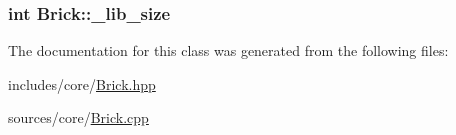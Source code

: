 \subsubsection[{\+\_\+lib\+\_\+size}]{\setlength{\rightskip}{0pt plus 5cm}int Brick\+::\+\_\+lib\+\_\+size\hspace{0.3cm}{\ttfamily [protected]}}\label{class_brick_a990cb3ac8d11d28aa1fa68a4583ed704}


The documentation for this class was generated from the following files\+:\begin{DoxyCompactItemize}
\item 
includes/core/\hyperlink{_brick_8hpp}{Brick.\+hpp}\item 
sources/core/\hyperlink{_brick_8cpp}{Brick.\+cpp}\end{DoxyCompactItemize}
